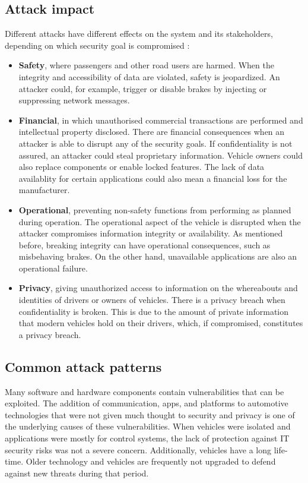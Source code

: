 \subsection{Attack impact}

Different attacks have different effects on the system and its stakeholders, depending on which security goal is compromised \citep{Le2018}:

\begin{itemize}
    \item \textbf{Safety}, where passengers and other road users are harmed. When the integrity and accessibility of data are violated, safety is jeopardized. An attacker could, for example, trigger or disable brakes by injecting or suppressing network messages.
    \item \textbf{Financial}, in which unauthorised commercial transactions are performed and intellectual property disclosed. There are financial consequences when an attacker is able to disrupt any of the security goals. If confidentiality is not assured, an attacker could steal proprietary information. Vehicle owners could also replace components or enable locked features. The lack of data availablity for certain applications could also mean a financial loss for the manufacturer.
    \item \textbf{Operational}, preventing non-safety functions from performing as planned during operation. The operational aspect of the vehicle is disrupted when the attacker compromises information integrity or availability. As mentioned before, breaking integrity can have operational consequences, such as misbehaving brakes. On the other hand, unavailable applications are also an operational failure.
    \item \textbf{Privacy}, giving unauthorized access to information on the whereabouts and identities of drivers or owners of vehicles. There is a privacy breach when confidentiality is broken. This is due to the amount of private information that modern vehicles hold on their drivers, which, if compromised, constitutes a privacy breach.
\end{itemize}

\subsection{Common attack patterns}

Many software and hardware components contain vulnerabilities that can be exploited. The addition of communication, apps, and platforms to automotive technologies that were not given much thought to security and privacy is one of the underlying causes of these vulnerabilities. When vehicles were isolated and applications were mostly for control systems, the lack of protection against IT security risks was not a severe concern. Additionally, vehicles have a long life-time. Older technology and vehicles are frequently not upgraded to defend against new threats during that period.\par

